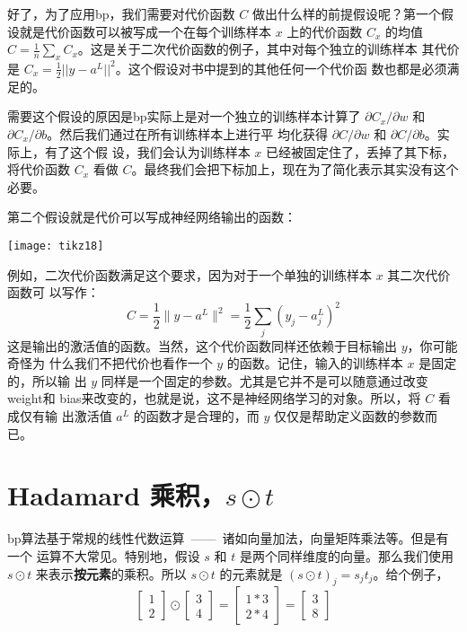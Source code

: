 好了，为了应用\gls*{bp}，我们需要对代价函数 $C$ 做出什么样的前提假设呢？第一个假
设就是代价函数可以被写成一个在每个训练样本 $x$ 上的代价函数 $C_x$ 的均值
$C=\frac{1}{n} \sum_x C_x$。这是关于二次代价函数的例子，其中对每个独立的训练样本
其代价是 $C_x = \frac{1}{2} ||y-a^L||^2$。这个假设对书中提到的其他任何一个代价函
数也都是必须满足的。

需要这个假设的原因是\gls*{bp}实际上是对一个独立的训练样本计算了 $\partial
C_x/\partial w$ 和 $\partial C_x/\partial b$。然后我们通过在所有训练样本上进行平
均化获得 $\partial C/\partial w$ 和 $\partial C/\partial b$。实际上，有了这个假
设，我们会认为训练样本 $x$ 已经被固定住了，丢掉了其下标，将代价函数 $C_x$ 看做
$C$。最终我们会把下标加上，现在为了简化表示其实没有这个必要。

第二个假设就是代价可以写成神经网络输出的函数：

\begin{center}
  \texttt{[image: tikz18]}
\end{center}

例如，二次代价函数满足这个要求，因为对于一个单独的训练样本 $x$ 其二次代价函数可
以写作：
\begin{equation}
  C = \frac{1}{2} \|y-a^L\|^2 = \frac{1}{2} \sum_j (y_j-a^L_j)^2
  \label{eq:27}\tag{27}
\end{equation}
这是输出的激活值的函数。当然，这个代价函数同样还依赖于目标输出 $y$，你可能奇怪为
什么我们不把代价也看作一个 $y$ 的函数。记住，输入的训练样本 $x$ 是固定的，所以输
出 $y$ 同样是一个固定的参数。尤其是它并不是可以随意通过改变\gls*{weight}和%
\gls*{bias}来改变的，也就是说，这不是神经网络学习的对象。所以，将 $C$ 看成仅有输
出激活值 $a^L$ 的函数才是合理的，而 $y$ 仅仅是帮助定义函数的参数而已。

\section{Hadamard 乘积，$s \odot t$}
\label{sec:the_hadamard_product}

\gls*{bp}算法基于常规的线性代数运算~——~诸如向量加法，向量矩阵乘法等。但是有一个
运算不大常见。特别地，假设 $s$ 和 $t$ 是两个同样维度的向量。那么我们使用 $s\odot
t$ 来表示\textbf{按元素}的乘积。所以 $s\odot t$ 的元素就是 $(s\odot t)_j = s_j
t_j$。给个例子，
\begin{equation}
  \left[\begin{array}{c} 1 \\ 2 \end{array}\right]
  \odot \left[\begin{array}{c} 3 \\ 4\end{array} \right]
  = \left[ \begin{array}{c} 1 * 3 \\ 2 * 4 \end{array} \right]
  = \left[ \begin{array}{c} 3 \\ 8 \end{array} \right]
  \label{eq:28}\tag{28}
\end{equation}

